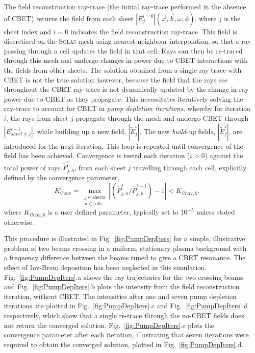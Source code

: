 The field reconstruction ray-trace (the initial ray-trace performed in the absence of \ac{CBET}) returns the field from each sheet $|E_j^{i=0}|(\vec{x},\vec{k},\omega,\phi)$, where $j$ is the sheet index and $i=0$ indicates the field reconstruction ray-trace.
This field is discretised on the \textsc{Solas} mesh using nearest neighbour interpolation, so that a ray passing through a cell updates the field in that cell.
Rays can then be re-traced through this mesh and undergo changes in power due to \ac{CBET} interactions with the fields from other sheets.
The solution obtained from a single ray-trace with \ac{CBET} is not the true solution however, because the field that the rays see throughout the \ac{CBET} ray-trace is not dynamically updated by the change in ray power due to \ac{CBET} as they propagate.
This necessitates iteratively solving the ray-trace to account for \ac{CBET} in \textit{pump depletion iterations}, whereby for iteration $i$, the rays from sheet $j$ propagate through the mesh and undergo \ac{CBET} through $|E_{sheet\neq j}^{i-1}|$, while building up a new field, $|\tilde{E}_{j}^{i}|$.
The new \textit{build-up} fields, $|\tilde{E}_{j}^{i}|$, are introduced for the next iteration.
This loop is repeated until convergence of the field has been achieved.
Convergence is tested each iteration ($i>0$) against the total power of rays $\tilde{P}_{j,n}^{i}$, from each sheet $j$ travelling through each cell, explicitly defined by the convergence parameter,
\begin{equation}
    K_{\text{Conv}}^i = \max_{\substack{j\in \text{sheets} \\ n\in \text{cells}}} \left| \left( \tilde{P}_{j,n}^{i}/\tilde{P}_{j,n}^{i-1} \right) -1 \right| < K_{\text{Conv},0},
\end{equation}
where $K_{\text{Conv},0}$ is a user defined parameter, typically set to $10^{-5}$ unless stated otherwise.

This procedure is illustrated in Fig.~\ref{fig:PumpDepIters} for a simple, illustrative problem of two beams crossing in a uniform, stationary plasma background with a frequency difference between the beams tuned to give a \ac{CBET} resonance.
The effect of \ac{Inv-Brem} deposition has been neglected in this simulation.
Fig.~\ref{fig:PumpDepIters}.a shows the ray trajectories for the two crossing beams and Fig.~\ref{fig:PumpDepIters}.b plots the intensity from the field reconstruction iteration, without \ac{CBET}.
The intensities after one and seven pump depletion iterations are plotted in Fig.~\ref{fig:PumpDepIters}.c and Fig.~\ref{fig:PumpDepIters}.d respectively, which show that a single re-trace through the no-\ac{CBET} fields does not return the converged solution.
Fig.~\ref{fig:PumpDepIters}.e plots the convergence parameter after each iteration, illustrating that seven iterations were required to obtain the converged solution, plotted in Fig.~\ref{fig:PumpDepIters}.d.

